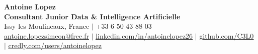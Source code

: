 \documentclass[letterpaper,10pt]{article}
\begin{document}
\begin{center}
    {\Huge \textbf{Antoine Lopez}} \\ \vspace{2pt}
    {\large \textbf{Consultant Junior Data \& Intelligence Artificielle}} \\ \vspace{3pt}
    \small
    Issy-les-Moulineaux, France $|$ +33 6 50 43 88 03 \\
    \href{mailto:antoine.lopezsimeon@free.fr}{\underline{antoine.lopezsimeon@free.fr}} $|$ 
    \href{https://linkedin.com/in/antoinelopez26}{\underline{linkedin.com/in/antoinelopez26}} $|$
    \href{https://github.com/C3L0}{\underline{github.com/C3L0}} $|$
    \href{https://www.credly.com/users/antoinelopez26}{\underline{credly.com/users/antoinelopez}}
\end{center}

\vspace{-10pt}







\end{document}
